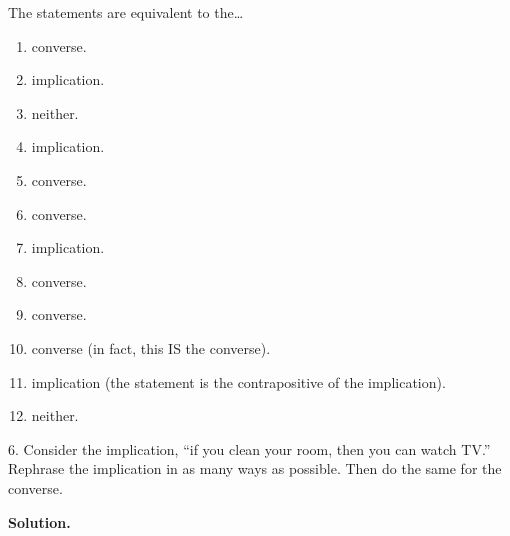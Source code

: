 \documentclass[10pt,]{book}
\theoremstyle{plain}
\theoremstyle{definition}
\theoremstyle{definition}
\theoremstyle{definition}
\begin{document}
\begin{exerciselist}
          The statements are equivalent to the\dots{}
\leavevmode%
\begin{enumerate}[label=(\alph*)]
\item\hypertarget{li-115}{} converse. %
\item\hypertarget{li-116}{} implication. %
\item\hypertarget{li-117}{} neither. %
\item\hypertarget{li-118}{} implication. %
\item\hypertarget{li-119}{} converse. %
\item\hypertarget{li-120}{} converse. %
\item\hypertarget{li-121}{} implication. %
\item\hypertarget{li-122}{} converse. %
\item\hypertarget{li-123}{} converse. %
\item\hypertarget{li-124}{} converse (in fact, this IS the converse). %
\item\hypertarget{li-125}{} implication (the statement is the contrapositive of the implication). %
\item\hypertarget{li-126}{} neither. %
\end{enumerate}
\item[6.]\hypertarget{exercise-6}{}
          Consider the implication, ``if you clean your room, then you can watch TV.'' Rephrase the implication in as many ways as possible. Then do the same for the converse.
\par\smallskip
\par\smallskip
\noindent\textbf{Solution.}\hypertarget{solution-12}{}\quad


\end{exerciselist}
\end{document}
